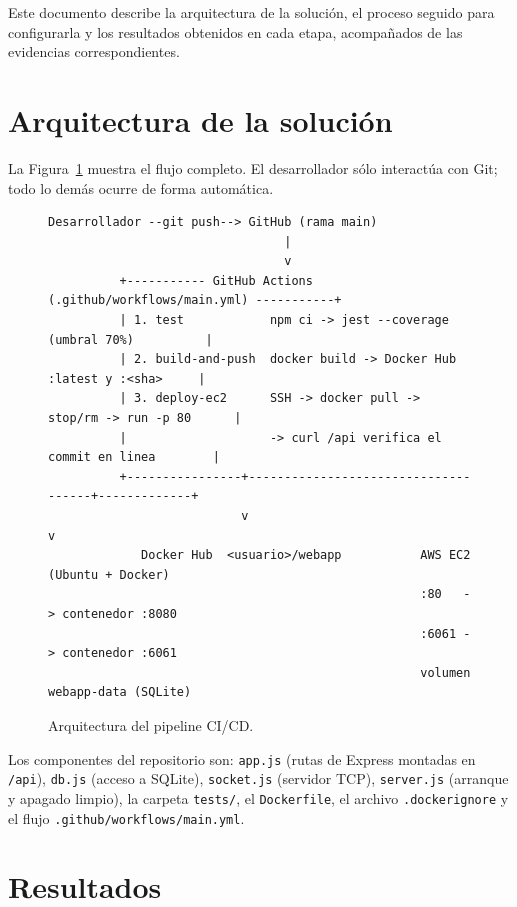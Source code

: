 \documentclass[12pt,letterpaper]{article}
\begin{document}
Este documento describe la arquitectura de la solución, el proceso seguido para configurarla y los resultados obtenidos en cada etapa, acompañados de las evidencias correspondientes.

\newpage
\section{Arquitectura de la solución}

La Figura~\ref{fig:arquitectura} muestra el flujo completo. El desarrollador sólo interactúa con Git; todo lo demás ocurre de forma automática.

\begin{figure}[H]
\centering
\begin{lstlisting}[basicstyle=\ttfamily\scriptsize,frame=none,backgroundcolor=\color{white}]
 Desarrollador --git push--> GitHub (rama main)
                                 |
                                 v
          +----------- GitHub Actions (.github/workflows/main.yml) -----------+
          | 1. test            npm ci -> jest --coverage (umbral 70%)          |
          | 2. build-and-push  docker build -> Docker Hub :latest y :<sha>     |
          | 3. deploy-ec2      SSH -> docker pull -> stop/rm -> run -p 80      |
          |                    -> curl /api verifica el commit en linea        |
          +----------------+-------------------------------------+-------------+
                           v                                     v
             Docker Hub  <usuario>/webapp           AWS EC2 (Ubuntu + Docker)
                                                    :80   -> contenedor :8080
                                                    :6061 -> contenedor :6061
                                                    volumen webapp-data (SQLite)
\end{lstlisting}
\caption{Arquitectura del pipeline CI/CD.}
\label{fig:arquitectura}
\end{figure}

Los componentes del repositorio son: \texttt{app.js} (rutas de Express montadas en \texttt{/api}), \texttt{db.js} (acceso a SQLite), \texttt{socket.js} (servidor TCP), \texttt{server.js} (arranque y apagado limpio), la carpeta \texttt{tests/}, el \texttt{Dockerfile}, el archivo \texttt{.dockerignore} y el flujo \texttt{.github/workflows/main.yml}.

\section{Resultados}
\end{document}
